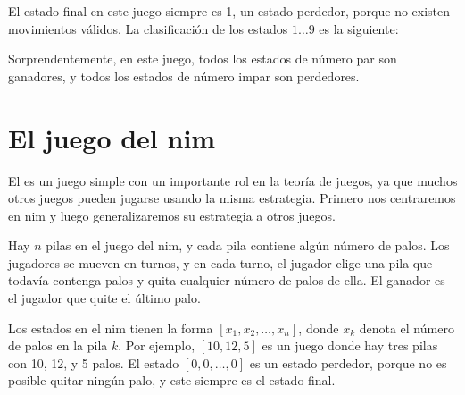 El estado final en este juego siempre es 1, un estado perdedor,
porque no existen movimientos válidos. La clasificación de los estados
$1 \ldots 9$ es la siguiente:

\begin{center}
\end{center}

Sorprendentemente, en este juego, todos los estados de número par son
ganadores, y todos los estados de número impar son perdedores.

\section{El juego del nim}


El  es un juego simple con un importante rol en la
teoría de juegos, ya que muchos otros juegos pueden jugarse usando la misma
estrategia. Primero nos centraremos en nim y luego generalizaremos su
estrategia a otros juegos.

Hay $n$ pilas en el juego del nim, y cada pila contiene algún número de
palos. Los jugadores se mueven en turnos, y en cada turno, el jugador
elige una pila que todavía contenga palos y quita cualquier número de palos
de ella. El ganador es el jugador que quite el último palo.

Los estados en el nim tienen la forma $[x_1,x_2,\ldots,x_n]$, donde $x_k$
denota el número de palos en la pila $k$. Por ejemplo, $[10,12,5]$ es un
juego donde hay tres pilas con 10, 12, y 5 palos. El estado $[0,0,\ldots,0]$
es un estado perdedor, porque no es posible quitar ningún palo, y este
siempre es el estado final.


